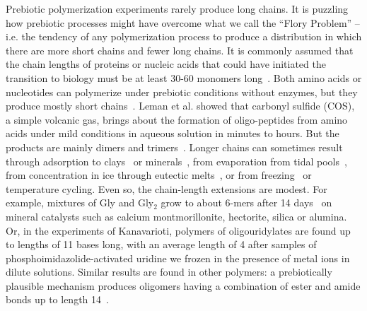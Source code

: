 \documentclass[5p,times]{elsarticle}
\begin{document}
Prebiotic polymerization experiments rarely produce long chains.  It is puzzling how prebiotic 
processes might have overcome what we call the ``Flory Problem'' -- i.e. the tendency of any 
polymerization process to produce a distribution in which there are more short chains and fewer 
long chains.  It is commonly assumed that the chain lengths of proteins or nucleic acids that could 
have initiated the transition to biology must be at least 30-60 monomers long~\cite{Szostak1993}.  
Both amino acids or nucleotides can polymerize under prebiotic conditions without enzymes, but they 
produce mostly short chains~\cite{Shock1992,Martin1998,PAECHT-HOROWITZ1970,Leman2004a,Orgel2004}.  
Leman et al. showed that carbonyl sulfide (COS), a simple volcanic gas, brings about the formation 
of oligo-peptides from amino acids under mild conditions in aqueous solution in minutes to hours. 
But the products are mainly dimers and trimers~\cite{Leman2004a}.  Longer chains can sometimes 
result through adsorption to clays~\cite{Rao1980,Lambert2008} or 
minerals~\cite{Bernal1949,Ferris1996}, from evaporation from tidal pools~\cite{Nelson2001}, from 
concentration in ice through eutectic melts~\cite{Kanavarioti2001}, or from 
freezing~\cite{Bada2004} or temperature cycling.  Even so, the chain-length extensions are modest.  
For example, mixtures of Gly and Gly$_2$ grow to about 6-mers after 14 
days~\cite{Rode1997,Rode1999} 
on mineral catalysts such as calcium montmorillonite, hectorite, silica or alumina.  Or, in the 
experiments of Kanavarioti, polymers of oligouridylates are found up to lengths of 11 bases long, 
with an average length of 4 \cite{Kanavarioti2001} after samples of phosphoimidazolide-activated 
uridine we frozen in the presence of metal ions in dilute solutions.  Similar results are found in 
other polymers: a prebiotically plausible mechanism produces oligomers having a combination of 
ester 
and amide bonds up to length 14~\cite{Forsythe2015}.  
\end{document}
